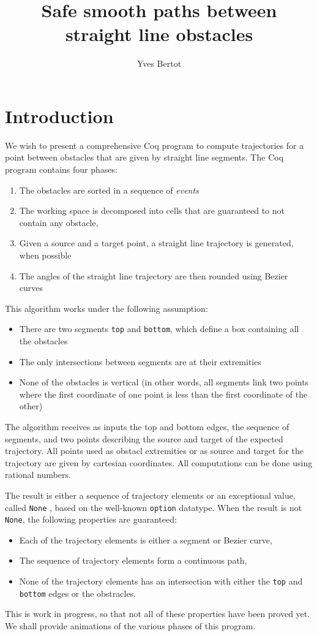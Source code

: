 \documentclass{easychair}
\title{Safe smooth paths between straight line obstacles}
\author{Yves Bertot}
\institute{Inria Université Côte d'Azur}
\begin{document}
\maketitle
\section{Introduction}
We wish to present a comprehensive Coq program
to compute trajectories for a point between obstacles that are given by straight
line segments.  The Coq program contains four phases:
\begin{enumerate}
\item The obstacles are sorted in a sequence of {\em events}
\item The working space is decomposed into cells that are guaranteed to not contain
 any obstacle,
\item Given a source and a target point, a straight line trajectory is generated,
when possible
\item The angles of the straight line trajectory are then rounded using Bezier curves
\end{enumerate}
This algorithm works under the following assumption:
\begin{itemize}
\item There are two segments {\tt top} and {\tt bottom}, which define a box containing
all the obstacles
\item The only intersections between segments are at their extremities
\item None of the obstacles is vertical (in other words, all segments link two points
where the first coordinate of one point is less than the first coordinate of the other)
\end{itemize}

The algorithm receives as inputs the top and bottom edges, the sequence of segments,
and two points describing the source and target of the expected trajectory.  All
points used as obstacl extremities or as source and target for the trajectory are
given by cartesian coordinates.  All computations can be done using rational numbers.

The result is either a sequence of trajectory elements or an exceptional value, called
{\tt None} , based
on the well-known {\tt option} datatype.  When the result is not {\tt None},
the following properties are guaranteed:
\begin{itemize}
\item Each of the trajectory elements is either a segment or Bezier curve,
\item The sequence of trajectory elements form a continuous path,
\item None of the trajectory elements has an intersection with either
the {\tt top} and {\tt bottom} edges or the obstracles.
\end{itemize}
This is work in progress, so that not all of these properties have been proved yet.
We shall provide animations of the various phases of this program.
\end{document}
